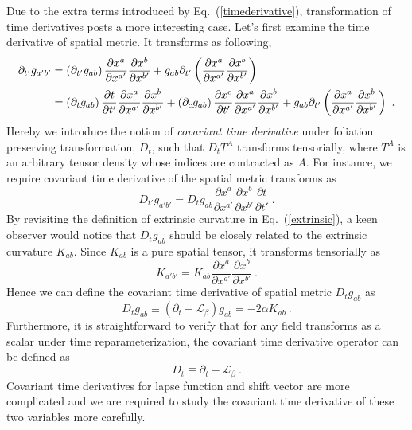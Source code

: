 Due to the extra terms introduced by Eq.~(\ref{timederivative}), transformation of time derivatives posts a more interesting case. Let's first examine the time derivative of spatial metric. It transforms as following, 
\begin{align}
\partial_{t'}g_{a'b'} & = \left(\partial_{t'}g_{ab}\right)\frac{\partial x^{a}}{\partial x^{a'}}\frac{\partial x^{b}}{\partial x^{b'}} + g_{ab}\partial_{t'}\left(\frac{\partial x^{a}}{\partial x^{a'}}\frac{\partial x^{b}}{\partial x^{b'}}\right)\notag\\
& =  \left(\partial_{t}g_{ab}\right)\frac{\partial t}{\partial t'}\frac{\partial x^{a}}{\partial x^{a'}}\frac{\partial x^{b}}{\partial x^{b'}} + \left(\partial_{c}g_{ab}\right)\frac{\partial x^{c}}{\partial t'}\frac{\partial x^{a}}{\partial x^{a'}}\frac{\partial x^{b}}{\partial x^{b'}} + g_{ab}\partial_{t'}\left(\frac{\partial x^{a}}{\partial x^{a'}}\frac{\partial x^{b}}{\partial x^{b'}}\right) \ .
\end{align}
Hereby we introduce the notion of {\em covariant time derivative} under foliation preserving transformation, $D_{t}$, such that $D_{t}T^{A}$ transforms tensorially, where $T^{A}$ is an arbitrary tensor density whose indices are contracted as $A$. For instance, we require covariant time derivative of the spatial metric transforms as
\begin{equation}
	D_{t'}g_{a'b'} = D_{t}g_{ab}\frac{\partial x^{a}}{\partial x^{a'}}\frac{\partial x^{b}}{\partial x^{b'}}\frac{\partial t}{\partial t'} \ .
\end{equation}
By revisiting the definition of extrinsic curvature in Eq.~(\ref{extrinsic}), a keen observer would notice that $D_{t}g_{ab}$ should be closely related to the extrinsic curvature $K_{ab}$. Since $K_{ab}$ is a pure spatial tensor, it transforms tensorially as
\begin{equation}
	K_{a'b'} = K_{ab}\frac{\partial x^{a}}{\partial x^{a'}}\frac{\partial x^{b}}{\partial x^{b'}} \ .
\end{equation}
Hence we can define the covariant time derivative of spatial metric $D_{t}g_{ab}$ as
\begin{equation}\label{spatialmetriccovarianttimederivative}
	D_{t}g_{ab} \equiv (\partial_{t} - \mathcal{L}_{\beta})g_{ab} = -2\alpha K_{ab} \ .
\end{equation}
Furthermore, it is straightforward to verify that for any field transforms as a scalar under time reparameterization, the covariant time derivative operator can be defined as
\begin{equation}
	D_{t} \equiv \partial_{t} - \mathcal{L}_{\beta} \ .
\end{equation}
Covariant time derivatives for lapse function and shift vector are more complicated and we are required to study the covariant time derivative of these two variables more carefully. 

